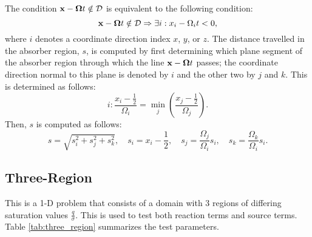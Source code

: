 The condition $\mathbf{x}-\mathbf{\Omega}t\notin\mathcal{D}$ is equivalent to the
following condition:
\[
   \mathbf{x}-\mathbf{\Omega}t\notin\mathcal{D} \Rightarrow
   \exists i: x_i-\Omega_i t < 0,
\]
where $i$ denotes a coordinate direction index $x$, $y$, or $z$.
The distance travelled in the absorber region, $s$, is computed
by first determining which plane segment of the absorber region
through which the line $\mathbf{x}-\mathbf{\Omega}t$ passes; the coordinate
direction normal to this plane is denoted by $i$ and the other
two by $j$ and $k$. This is determined as follows:
\[
   i: \frac{x_i-\frac{1}{2}}{\Omega_i} = \min\limits_j\left(
      \frac{x_j-\frac{1}{2}}{\Omega_j}\right).
\]
Then, $s$ is computed as follows:
\[
   s=\sqrt{s_i^2 + s_j^2 + s_k^2}, \quad
   s_i=x_i-\frac{1}{2}, \quad
   s_j=\frac{\Omega_j}{\Omega_i}s_i, \quad
   s_k=\frac{\Omega_k}{\Omega_i}s_i.
\]
\subsection{Three-Region}\label{sec:three_region}
This is a 1-D problem that consists of a domain with 3 regions of differing
saturation values $\frac{q}{\sigma}$. This is used to test both reaction
terms and source terms.
Table \ref{tab:three_region} summarizes the test parameters.

